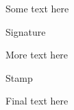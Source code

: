 \documentclass[11pt,a4paper]{article}
\begin{document}
Some text here

\begin{figure}[h]
\end{figure}

Signature

More text here

\begin{figure}[h]
\end{figure}

Stamp

Final text here
\end{document}
